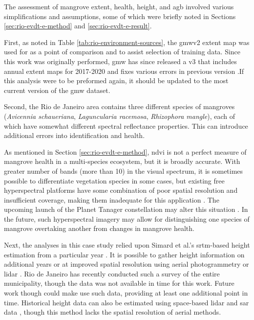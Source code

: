 The assessment of mangrove extent, health, height, and \ac{agb} involved various simplifications and assumptions, some of which were briefly noted in Sections \ref{sec:rio-evdt-e-method} and \ref{sec:rio-evdt-e-result}. 

First, as noted in Table \ref{tab:rio-environment-sources}, the \ac{gmw}v2 extent map was used for as a point of comparison and to assist selection of training data. Since this work was originally performed, \ac{gmw} has since released a v3 that includes annual extent maps for 2017-2020 and fixes various errors in previous version \cite{buntingGlobalMangroveExtent2022}.If this analysis were to be preformed again, it should be updated to the most current version of the \ac{gmw} dataset.

Second, the Rio de Janeiro area contains three different species of mangroves (\textit{Avicennia schaueriana}, \textit{Laguncularia racemosa}, \textit{Rhizophora mangle}), each of which have somewhat different spectral reflectance properties. This can introduce additional errors into identification and health.

As mentioned in Section \ref{sec:rio-evdt-e-method}, \ac{ndvi} is not a perfect measure of mangrove health in a multi-species ecosystem, but it is broadly accurate. With greater number of bands (more than 10) in the visual spectrum, it is sometimes possible to differentiate vegetation species in some cases, but existing free hyperspectral platforms have some combination of poor spatial resolution and insufficient coverage, making them inadequate for this application \cite{mousivandGlobalSensitivityAnalysis2014}. The upcoming launch of the Planet Tanager constellation may alter this situation \cite{planetlabspbcPlanetAnnouncesNew2022}. In the future, such hyperspectral imagery may allow for distinguishing one species of mangrove overtaking another from changes in mangrove health. 

Next, the analyses in this case study relied upon Simard et al.'s \ac{srtm}-based height estimation from a particular year \cite{simardMangroveCanopyHeight2019}. It is possible to gather height information on additional years or at improved spatial resolution using aerial photogrammetry or \ac{lidar} \cite{olagokeIndividualMangroveTree2015}. Rio de Janeiro has recently conducted such a survey of the entire municipality, though the data was not available in time for this work. Future work though could make use such data, providing at least one additional point in time. Historical height data can also be estimated using space-based \ac{lidar} and \ac{sar} data \cite{lagomasinoComparisonMangroveCanopy2016}, though this method lacks the spatial resolution of aerial methods.

